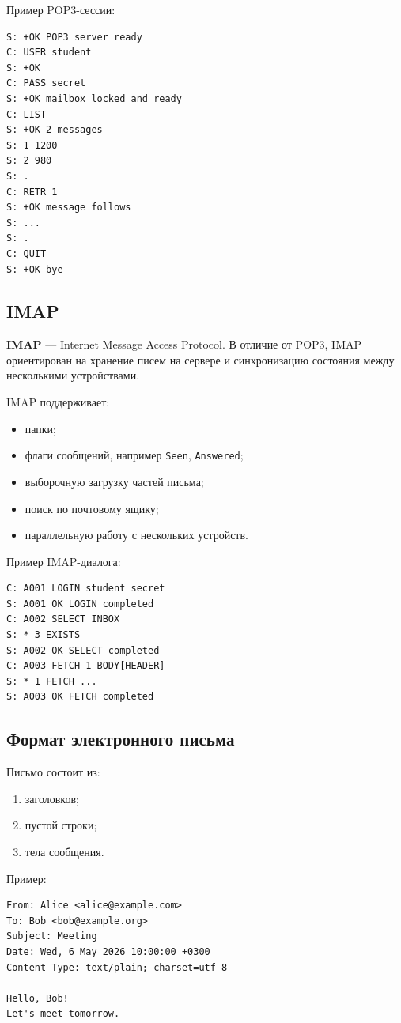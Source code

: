 \documentclass[12pt,a4paper]{article}
\begin{document}
Пример POP3-сессии:
\begin{lstlisting}
S: +OK POP3 server ready
C: USER student
S: +OK
C: PASS secret
S: +OK mailbox locked and ready
C: LIST
S: +OK 2 messages
S: 1 1200
S: 2 980
S: .
C: RETR 1
S: +OK message follows
S: ...
S: .
C: QUIT
S: +OK bye
\end{lstlisting}

\subsection{IMAP}

\textbf{IMAP} --- Internet Message Access Protocol. В отличие от POP3, IMAP ориентирован на хранение писем на сервере и синхронизацию состояния между несколькими устройствами.

IMAP поддерживает:
\begin{itemize}
    \item папки;
    \item флаги сообщений, например \texttt{Seen}, \texttt{Answered};
    \item выборочную загрузку частей письма;
    \item поиск по почтовому ящику;
    \item параллельную работу с нескольких устройств.
\end{itemize}

Пример IMAP-диалога:
\begin{lstlisting}
C: A001 LOGIN student secret
S: A001 OK LOGIN completed
C: A002 SELECT INBOX
S: * 3 EXISTS
S: A002 OK SELECT completed
C: A003 FETCH 1 BODY[HEADER]
S: * 1 FETCH ...
S: A003 OK FETCH completed
\end{lstlisting}

\subsection{Формат электронного письма}

Письмо состоит из:
\begin{enumerate}
    \item заголовков;
    \item пустой строки;
    \item тела сообщения.
\end{enumerate}

Пример:
\begin{lstlisting}
From: Alice <alice@example.com>
To: Bob <bob@example.org>
Subject: Meeting
Date: Wed, 6 May 2026 10:00:00 +0300
Content-Type: text/plain; charset=utf-8

Hello, Bob!
Let's meet tomorrow.
\end{lstlisting}
\end{document}
